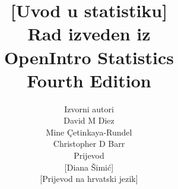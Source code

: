 

\title{\huge [Uvod u statistiku] \\[2mm]
\large Rad izveden iz \\
OpenIntro Statistics \\
Fourth Edition}
\author{\Large Izvorni autori \\[1.5mm]
\normalsize David M Diez \\
\normalsize Mine \c{C}etinkaya-Rundel \\[8mm]
\normalsize Christopher D Barr \\
\Large Prijevod \\[1.5mm]
\normalsize [Diana \v{S}imi\'{c}] \\
\small [Prijevod na hrvatski jezik] \\[2mm]
}


